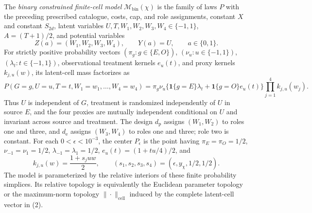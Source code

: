 The \emph{binary constrained finite-cell model} \(\mathcal M_{\mathrm{bin}}(\chi)\) is the family of laws \(P\) with the preceding prescribed catalogue, costs, cap, and role assignments, constant \(X\) and constant \(S_{2d}\), latent variables \(U,T,W_1,W_2,W_3,W_4\in\{-1,1\}\), \(A=(T+1)/2\), and potential variables
\[
 Z(a)=(W_1,W_2,W_3,W_4),\qquad Y(a)=U,
 \qquad a\in\{0,1\}.
\]
For strictly positive probability vectors \((\pi_g:g\in\{E,O\})\), \((\nu_u:u\in\{-1,1\})\), \((\lambda_t:t\in\{-1,1\})\), observational treatment kernels \(e_u(t)\), and proxy kernels \(k_{j,u}(w)\), its latent-cell mass factorizes as
\[
 P(G=g,U=u,T=t,W_1=w_1,\ldots,W_4=w_4)
 =\pi_g\nu_u\bigl\{\mathbf 1\{g=E\}\lambda_t
 +\mathbf 1\{g=O\}e_u(t)\bigr\}
 \prod_{j=1}^4k_{j,u}(w_j).                               \tag{2}
\]
Thus \(U\) is independent of \(G\), treatment is randomized independently of \(U\) in source \(E\), and the four proxies are mutually independent conditional on \(U\) and invariant across source and treatment. The design \(d_{\mathrm p}\) assigns \((W_1,W_2)\) to roles one and three, and \(d_{\mathrm e}\) assigns \((W_3,W_4)\) to roles one and three; role two is constant. For each \(0<\epsilon<10^{-3}\), the center \(P_\epsilon\) is the point having \(\pi_E=\pi_O=1/2\), \(\nu_{-1}=\nu_1=1/2\), \(\lambda_{-1}=\lambda_1=1/2\), \(e_u(t)=(1+tu/4)/2\), and
\[
 k_{j,u}(w)=\frac{1+s_juw}{2},
 \qquad
 (s_1,s_2,s_3,s_4)=(\epsilon,y_{\chi},1/2,1/2).
\]
The model is parameterized by the relative interiors of these finite probability simplices. Its relative topology is equivalently the Euclidean parameter topology or the maximum-norm topology \(\|\cdot\|_{\mathrm{cell}}\) induced by the complete latent-cell vector in (2).